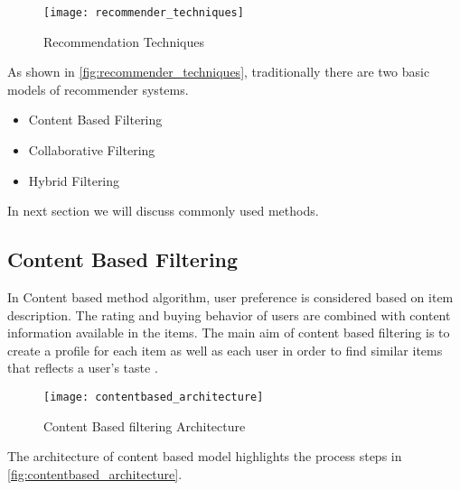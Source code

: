 \begin{figure}[H]
	\centering
	\texttt{[image: recommender\_techniques]}
	\caption{Recommendation Techniques \cite{33}}
	\label{fig:recommender_techniques}
\end{figure}


\noindent As shown in \autoref{fig:recommender_techniques}, traditionally there are two basic models of recommender systems. \begin{itemize} \item Content Based Filtering \item Collaborative Filtering \item Hybrid Filtering \end{itemize}
In next section we will discuss commonly used methods.
\pagebreak

\subsection{Content Based Filtering}
In Content based method algorithm, user preference is considered based on item description. The rating and buying behavior of users are combined with content information available in the items. The main aim of content based filtering is to create a profile for each item as well as each user in order to find similar items that reflects a user's taste \cite{6}.
\\

\begin{figure}[H]
	\centering
	\texttt{[image: contentbased\_architecture]}
	\caption{Content Based filtering Architecture \cite{5}}
	\label{fig:contentbased_architecture}
\end{figure}

\noindent 
The architecture of content based model highlights the process steps in \autoref{fig:contentbased_architecture}. 


